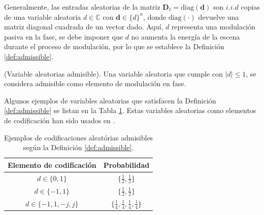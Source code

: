 Generalmente, las entradas aleatorias de la matriz  $\mathbf{D}_{\ell} = \mathrm{diag}(\mathbf{d})$ son $i.i.d$ copias de una variable aleatoria $d \in \mathbb{C}$ con $\mathbf{d} \in \{d\}^{n}$, donde $\mathrm{diag}(\cdot)$ devuelve una matriz diagonal cuadrada de un vector dado. Aquí, $d$ representa una modulación pasiva en la fase, se debe imponer que $d$ no aumenta la energía de la escena durante el proceso de modulación, por lo que se establece la Definición \ref{def:admissible}.

\begin{definition}{(Variable aleatorias admisible). } 
    Una variable aleatoria que cumple con $|d|\leq 1$, se considera admisible como elemento de modulación en fase.\label{def:admissible}
\end{definition}


Algunos ejemplos de variables aleatorias que satisfacen la Definición \ref{def:admissible} se listan en la Tabla \ref{tab:admi_examples}. Estas variables aleatorias como elementos de codificación han sido usados en .

\begin{table}[!h]
\centering
\begin{tabular}{|c|c|}
\hline
\textbf{Elemento de codificación} & \textbf{Probabilidad}                     \\ \hline
$d \in \{0, 1\}$         & $\{ \frac{1}{2},  \frac{1}{2}\}$ \\ \hline
$d \in \{-1, 1\}$        & $\{ \frac{1}{2},  \frac{1}{2}\}$ \\ \hline
$d \in \{-1, 1, -j,  j\}$ & $\{ \frac{1}{4},  \frac{1}{4}, \frac{1}{4},  \frac{1}{4}\}$ \\ \hline
\end{tabular}
\caption{Ejemplos de codificaciones aleatórias admisibles según la Definición \ref{def:admissible}.}
\label{tab:admi_examples}
\end{table}



